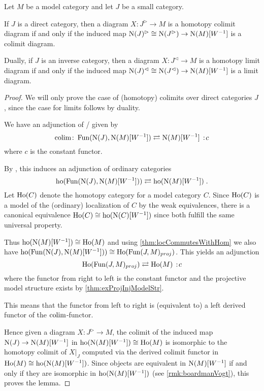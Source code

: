 \begin{lemma}\label{lem:htpyLimAndColimAgree}
    Let $M$ be a model category and let $J$ be a small category.
    
    If $J$ is a direct category, then a diagram $X\colon J^{\rhd}\to M$ is a homotopy colimit diagram if and only if the induced map $\operatorname{N}(J)^{\rhd}\cong\operatorname{N}(J^{\rhd})\to\operatorname{N}(M)[W^{-1}]$ is a colimit diagram.

    Dually, if $J$ is an inverse category, then a diagram $X\colon J^{\lhd}\to M$ is a homotopy limit diagram if and only if the induced map $\operatorname{N}(J)^{\lhd}\cong\operatorname{N}(J^{\lhd})\to\operatorname{N}(M)[W^{-1}]$ is a limit diagram.
    \begin{proof}
        We will only prove the case of (homotopy) colimits over direct categories $J$, since the case for limits follows by duality.

        We have an adjunction of \inftycats/ given by 
        \begin{equation*}
            \colim\colon\Fun(\N(J),\N(M)[W^{-1}])\rightleftarrows\N(M)[W^{-1}]\mkern+3mu:\mkern-3mu c
        \end{equation*}
        where $c$ is the constant functor.

        By \cite[Remark 6.1.5]{cisinski_2019}, this induces an adjunction of ordinary categories
        \begin{equation*}
            \operatorname{ho}(\operatorname{Fun}(\operatorname{N}(J),\operatorname{N}(M)[W^{-1}]))\rightleftarrows\operatorname{ho}(\operatorname{N}(M)[W^{-1}])\;.
        \end{equation*}
        Let $\operatorname{Ho}(C)$ denote the homotopy category for a model category $C$. 
        Since $\operatorname{Ho}(C)$ is a model of the (ordinary) localization of $C$ by the weak equivalences, there is a canonical equivalence $\operatorname{Ho}(C)\cong\operatorname{ho}(\operatorname{N}(C)[W^{-1}])$ since both fulfill the same universal property. %
        
        Thus $\operatorname{ho}(\operatorname{N}(M)[W^{-1}])\cong\operatorname{Ho}(M)$ and using \cref{thm:locCommutesWithHom} we also have $\operatorname{ho}(\operatorname{Fun}(\operatorname{N}(J),\operatorname{N}(M)[W^{-1}]))\cong\operatorname{Ho}(\operatorname{Fun}(J,M)_{proj})$.
        This yields an adjunction
        \begin{equation*}
            \Ho(\Fun(J,M)_{proj})\rightleftarrows\Ho(M)\mkern+3mu:\mkern-3mu c
        \end{equation*}
        where the functor from right to left is the constant functor and the projective model structure exists by \cref{thm:exProjInjModelStr}.

        This means that the functor from left to right is (equivalent to) a left derived functor of the $\operatorname*{colim}$-functor.

        Hence given a diagram $X\colon J^{\rhd}\to M$, the colimit of the induced map $\operatorname{N}(J)\to\operatorname{N}(M)[W^{-1}]$ in $\operatorname{ho}(\operatorname{N}(M)[W^{-1}])\cong\operatorname{Ho}(M)$ is isomorphic to the homotopy colimit of $X|_J$ computed via the derived colimit functor in $\operatorname{Ho}(M)\cong\operatorname{ho}(\operatorname{N}(M)[W^{-1}])$.
        Since objects are equivalent in $\operatorname{N}(M)[W^{-1}]$ if and only if they are isomorphic in $\operatorname{ho}(\operatorname{N}(M)[W^{-1}])$ (see \cref{rmk:boardmanVogt}), this proves the lemma. %
    \end{proof}
\end{lemma}
